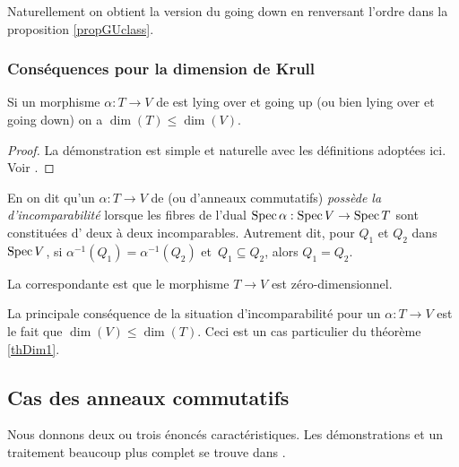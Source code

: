 Naturellement on obtient la version \proc du going down en renversant l'ordre dans la proposition \ref{propGUclass}.

\subsubsection*{Conséquences pour la dimension de Krull} 
\label{subsecGuGdKrull}

\begin{theorem} \label{thLYGUKdim}
Si un morphisme $\alpha:T\to V$ de \trdis est lying over et going up
(ou bien lying over et going down) on a 
$\dim(T)\leq \dim(V)$. 
\end{theorem}
%
\begin{proof}
La démonstration est simple et naturelle avec les définitions \covs adoptées ici. Voir \cite[section XIII-9]{ACMC}.
\end{proof}
%


\label{subsecIncomp}
En \clama on dit qu'un \homo $\alpha: T\to V$ de \trdis (ou d'anneaux commutatifs) \emph{poss\`ede la \prt d'incomparabilité} lorsque les fibres de l'\homo dual
${\rm Spec}\,\alpha:{\rm Spec}\, V\to{\rm Spec}\, T$ sont constituées d'\elts
deux \`a deux incomparables. 
Autrement dit, pour $ Q_1$
et $ Q_2$ dans~${\rm Spec}\, V$, si $\alpha^{-1}( Q_1)=\alpha^{-1}( Q_2)$ \hbox{et $ Q_1\subseteq Q_2$}, alors $Q_1=Q_2$.

La \dfn \cov correspondante est que le morphisme $ T\to V$ est zéro-dimensionnel.


 La principale conséquence de la situation d'incomparabilité
pour un \homo $\alpha: T\to V$ est le
fait que $\dim (V)\leq \dim (T)$. Ceci est un cas particulier du théorème \ref{thDim1}.


\subsection{Cas des anneaux commutatifs}\label{secGUpAC} 

Nous donnons deux ou trois énoncés caractéristiques. Les démonstrations et un traitement beaucoup plus complet se trouve dans \cite[section~\hbox{XIII-9}]{ACMC}. 

